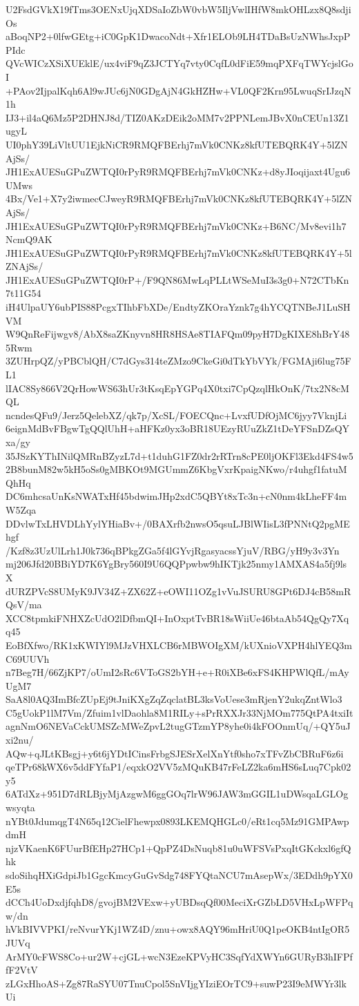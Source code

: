 U2FsdGVkX19fTms3OENxUjqXDSaIoZbW0vbW5IljVwlIHfW8mkOHLzx8Q8sdjiOs
aBoqNP2+0lfwGEtg+iC0GpK1DwacoNdt+Xfr1ELOb9LH4TDaBsUzNWhsJxpPPIdc
QVcWICzXSiXUEklE/ux4viF9qZ3JCTYq7vty0CqfL0dFiE59mqPXFqTWYcjslGoI
+PAov2IjpalKqh6Al9wJUc6jN0GDgAjN4GkHZHw+VL0QF2Krn95LwuqSrIJzqN1h
IJ3+il4aQ6Mz5P2DHNJ8d/TIZ0AKzDEik2oMM7v2PPNLemJBvX0nCEUn13Z1ugyL
UI0phY39LiVltUU1EjkNiCR9RMQFBErhj7mVk0CNKz8kfUTEBQRK4Y+5lZNAjSs/
JH1ExAUESuGPuZWTQI0rPyR9RMQFBErhj7mVk0CNKz+d8yJIoqijaxt4Ugu6UMws
4Bx/Ve1+X7y2iwmecCJweyR9RMQFBErhj7mVk0CNKz8kfUTEBQRK4Y+5lZNAjSs/
JH1ExAUESuGPuZWTQI0rPyR9RMQFBErhj7mVk0CNKz+B6NC/Mv8evi1h7NcmQ9AK
JH1ExAUESuGPuZWTQI0rPyR9RMQFBErhj7mVk0CNKz8kfUTEBQRK4Y+5lZNAjSs/
JH1ExAUESuGPuZWTQI0rP+/F9QN86MwLqPLLtWSeMuI3s3g0+N72CTbKn7t11G54
iH4UlpaUY6ubPIS88PcgxTIhbFbXDe/EndtyZKOraYznk7g4hYCQTNBeJ1LuSHVM
W9QnReFijwgv8/AbX8saZKnyvn8HR8HSAe8TIAFQm09pyH7DgKIXE8hBrY485Rwm
3ZUHrpQZ/yPBCblQH/C7dGys314teZMzo9CkeGi0dTkYbVYk/FGMAji6lug75FL1
lIAC8Sy866V2QrHowWS63hUr3tKsqEpYGPq4X0txi7CpQzqlHkOnK/7tx2N8cMQL
ncndesQFu9/Jerz5QelebXZ/qk7p/XcSL/FOECQnc+LvxfUDfOjMC6jyy7VknjLi
6eignMdBvFBgwTgQQlUhH+aHFKz0yx3oBR18UEzyRUuZkZ1tDeYFSnDZsQYxa/gy
35JSzKYThINilQMRnBZyzL7d+t1duhG1FZ0dr2rRTrn8cPE0ljOKFl3Ekd4FS4w5
2B8bunM82w5kH5oSs0gMBKOt9MGUmmZ6KbgVxrKpaigNKwo/r4uhgf1fatuMQhHq
DC6mhcsaUnKsNWATxHf45bdwimJHp2xdC5QBYt8xTc3n+cN0nm4kLheFF4mW5Zqa
DDvlwTxLHVDLhYylYHiaBv+/0BAXrfb2nwsO5qsuLJBlWIisL3fPNNtQ2pgMEhgf
/Kzf8z3UzUlLrh1J0k736qBPkgZGa5f4lGYvjRgasyacssYjuV/RBG/yH9y3v3Yn
mj206Jfd20BBiYD7K6YgBry560I9U6QQPpwbw9hIKTjk25nmy1AMXAS4a5fj9lsX
dURZPVcS8UMyK9JV34Z+ZX62Z+eOWI11OZg1vVuJSURU8GPt6DJ4cB58mRQsV/ma
XCC8tpmkiFNHXZcUdO2lDfbmQI+InOxptTvBR18sWiiUe46btaAb54QgQy7Xqq45
EoBfXfwo/RK1xKWIYl9MJzVHXLCB6rMBWOIgXM/kUXnioVXPH4hlYEQ3mC69UUVh
n7Beg7H/66ZjKP7/oUmI2sRc6VToGS2bYH+e+R0iXBe6xFS4KHPWlQfL/mAyUgM7
SaA8l0AQ3ImBfcZUpEj9tJniKXgZqZqclatBL3ksVoUese3mRjenY2ukqZntWlo3
C5gUokP1lM7Vm/Zfuim1vlDaohla8M1RILy+sPrRXXJr33NjMOm775QtPA4txiIt
agnNmO6NEVaCckUMSZcMWeZpvL2tugGTzmYP8yhe0i4kFOOnmUq/+QY5uJxi2nu/
AQw+qJLtKBsgj+y6t6jYDtICinsFrbgSJESrXelXnYtf0sho7xTFvZbCBRuF6z6i
qeTPr68kWX6v5ddFYfaP1/eqxkO2VV5zMQuKB47rFeLZ2ka6mHS6sLuq7Cpk02y5
6ATdXz+951D7dRLBjyMjAzgwM6ggGOq7lrW96JAW3mGGIL1uDWsqaLGLOgwsyqta
nYBt0JdumqgT4N65q12CielFhewpx0893LKEMQHGLc0/eRt1cq5Mz91GMPAwpdmH
njzVKaenK6FUurBfEHp27HCp1+QpPZ4DsNuqb81u0uWFSVsPxqItGKckxl6gfQhk
sdoSihqHXiGdpiJb1GgcKmcyGuGvSdg748FYQtaNCU7mAsepWx/3EDdh9pYX0E5s
dCCh4UoDxdjfqhD8/gvojBM2VExw+yUBDsqQf00MeciXrGZbLD5VHxLpWFPqw/dn
hVkBIVVPKI/reNvurYKj1WZ4D/znu+owx8AQY96mHriU0Q1peOKB4ntIgOR5JUVq
ArMY0cFWS8Co+ur2W+cjGL+wcN3EzeKPVyHC3SqfYdXWYn6GURyB3hIFPffF2VtV
zLGxHhoAS+Zg87RaSYU07TnuCpol5SnVIjgYIziEOrTC9+suwP23I9eMWYr3lkUi
